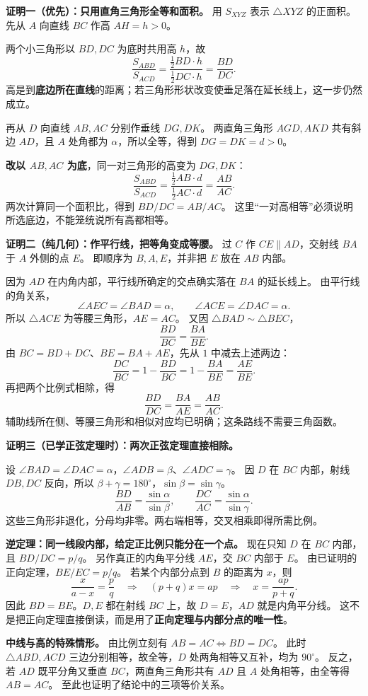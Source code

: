 \clearpage
\begin{proofbox}
\textbf{证明一（优先）：只用直角三角形全等和面积。}
用 $S_{XYZ}$ 表示 $\triangle XYZ$ 的正面积。
先从 $A$ 向直线 $BC$ 作高 $AH=h>0$。

两个小三角形以 $BD,DC$ 为底时共用高 $h$，故
\[
 \frac{S_{ABD}}{S_{ACD}}
 =\frac{\tfrac12 BD\cdot h}{\tfrac12 DC\cdot h}
 =\frac{BD}{DC}.
\]
高是到\textbf{底边所在直线}的距离；若三角形形状改变使垂足落在延长线上，这一步仍然成立。

\tcbbreak
再从 $D$ 向直线 $AB,AC$ 分别作垂线 $DG,DK$。
两直角三角形 $AGD,AKD$ 共有斜边 $AD$，且 $A$ 处角都为 $\alpha$，所以全等，得到 $DG=DK=d>0$。

\textbf{改以 $AB,AC$ 为底}，同一对三角形的高变为 $DG,DK$：
\[
 \frac{S_{ABD}}{S_{ACD}}
 =\frac{\tfrac12 AB\cdot d}{\tfrac12 AC\cdot d}
 =\frac{AB}{AC}.
\]
两次计算同一个面积比，得到 $\boxed{BD/DC=AB/AC}$。
这里“一对高相等”必须说明所选底边，不能笼统说所有高都相等。

\tcbbreak
\textbf{证明二（纯几何）：作平行线，把等角变成等腰。}
过 $C$ 作 $CE\parallel AD$，交射线 $BA$ 于 $A$ 外侧的点 $E$。
即顺序为 $B,A,E$，并非把 $E$ 放在 $AB$ 内部。

因为 $AD$ 在内角内部，平行线所确定的交点确实落在 $BA$ 的延长线上。
由平行线的角关系，
\[
 \angle AEC=\angle BAD=\alpha,\qquad
 \angle ACE=\angle DAC=\alpha.
\]
所以 $\triangle ACE$ 为等腰三角形，$AE=AC$。
又因 $\triangle BAD\sim\triangle BEC$，
\[
 \frac{BD}{BC}=\frac{BA}{BE}.
\]
由 $BC=BD+DC$、$BE=BA+AE$，先从 $1$ 中减去上述两边：
\[
 \frac{DC}{BC}=1-\frac{BD}{BC}=1-\frac{BA}{BE}=\frac{AE}{BE}.
\]
再把两个比例式相除，得
\[
 \frac{BD}{DC}=\frac{BA}{AE}=\frac{AB}{AC}.
\]
辅助线所在侧、等腰三角形和相似对应均已明确；这条路线不需要三角函数。

\tcbbreak
\textbf{证明三（已学正弦定理时）：两次正弦定理直接相除。}

设 $\angle BAD=\angle DAC=\alpha$，$\angle ADB=\beta$、$\angle ADC=\gamma$。
因 $D$ 在 $BC$ 内部，射线 $DB,DC$ 反向，所以 $\beta+\gamma=180^\circ$，$\sin\beta=\sin\gamma$。
\[
 \frac{BD}{AB}=\frac{\sin\alpha}{\sin\beta},\qquad
 \frac{DC}{AC}=\frac{\sin\alpha}{\sin\gamma}.
\]
这些三角形非退化，分母均非零。两右端相等，交叉相乘即得所需比例。

\textbf{逆定理：同一线段内部，给定正比例只能分在一个点。}
现在只知 $D$ 在 $BC$ 内部，且 $BD/DC=p/q$。
另作真正的内角平分线 $AE$，交 $BC$ 内部于 $E$。
由已证明的正向定理，$BE/EC=p/q$。
若某个内部分点到 $B$ 的距离为 $x$，则
\[
 \frac{x}{a-x}=\frac pq
 \quad\Longrightarrow\quad (p+q)x=ap
 \quad\Longrightarrow\quad x=\frac{ap}{p+q}.
\]
因此 $BD=BE$。$D,E$ 都在射线 $BC$ 上，故 $D=E$，$AD$ 就是内角平分线。
这不是把正向定理直接倒读，而是用了\textbf{正向定理与内部分点的唯一性}。

\textbf{中线与高的特殊情形。}
由比例立刻有 $AB=AC\Longleftrightarrow BD=DC$。
此时 $\triangle ABD,ACD$ 三边分别相等，故全等，$D$ 处两角相等又互补，均为 $90^\circ$。
反之，若 $AD$ 既平分角又垂直 $BC$，两直角三角形共有 $AD$ 且 $A$ 处角相等，由全等得 $AB=AC$。
至此也证明了结论中的三项等价关系。
\end{proofbox}
